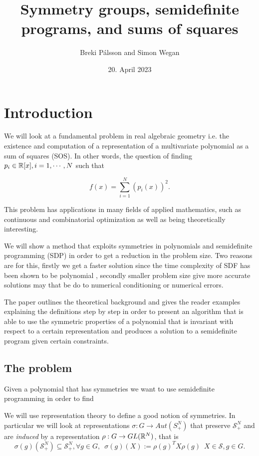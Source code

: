\documentclass[]{article}
\begin{document}
\title{Symmetry groups, semidefinite programs, and sums of squares}
\author{Breki Pálsson and Simon Wegan}
\date{20. April 2023}

\maketitle

\section{Introduction}
We will look at a fundamental problem in real algebraic geometry i.e. the existence and computation of a
representation of a multivariate polynomial as a sum of squares (SOS). In other words, the
question of finding $p_i \in \mathbb R[x], i = 1, \cdots, N$ such that

\[f(x) = \sum_{i=1}^{N}(p_i(x))^2.\]

This problem has applications in many fields of applied mathematics, such as continuous and combinatorial optimization as well as being theoretically interesting. 


We will show a method that exploits symmetries in polynomials and semidefinite programming (SDP) in order to get a reduction in the problem size. 
Two reasons are for this, firstly we get a faster solution since the time complexity of SDF has been shown to be polynomial , 
secondly smaller problem size give more accurate solutions may that be do to numerical conditioning or numerical errors.


The paper outlines the theoretical background and gives the reader examples explaining the definitions step by step in order to present an algorithm that is able to use the 
symmetric properties of a polynomial that is invariant with respect to a certain representation and produces a solution to a semidefinite program given certain constraints.

\subsection*{The problem}

Given a polynomial that has symmetries we want to use semidefinite programming in order to find

We will use representation theory to define a good notion of symmetries. In particular we will look at representations
$\sigma:G\rightarrow Aut(S_+^N)$ that preserve $\mathcal{S}_+^N$ and are \textit{induced} by a representation $\rho:G\rightarrow GL(\mathbb R^N)$, 
that is 
\[\sigma(g)(\mathcal{S}_+^N)\subseteq \mathcal{S}_+^N, \forall g\in G , \,\,\, \sigma(g)(X) := \rho(g)^TX\rho(g) \,\,\, X\in \mathcal{S} , g\in G.\]
\end{document}

